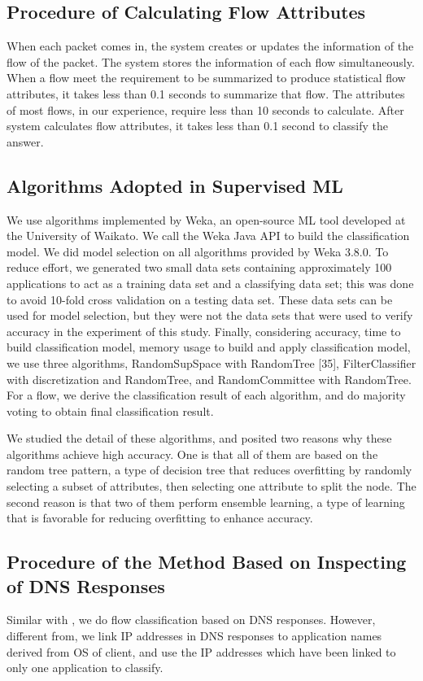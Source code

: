 \documentclass[journal]{IEEEtran}
\begin{document}
\subsection{Procedure of Calculating Flow Attributes}
When each packet comes in, the system creates or updates the information of the flow of the packet. The system stores the information of each flow simultaneously. When a flow meet the requirement to be summarized to produce statistical flow attributes, it takes less than 0.1 seconds to summarize that flow. The attributes of most flows, in our experience, require less than 10 seconds to calculate. After system calculates flow attributes, it takes less than 0.1 second to classify the answer.



\subsection{Algorithms Adopted in Supervised ML}
We use algorithms implemented by Weka, an open-source ML tool developed at the University of Waikato. We call the Weka Java API to build the classification model. We did model selection on all algorithms provided by Weka 3.8.0. To reduce effort, we generated two small data sets containing approximately 100 applications to act as a training data set and a classifying data set; this was done to avoid 10-fold cross validation on a testing data set. These data sets can be used for model selection, but they were not the data sets that were used to verify accuracy in the experiment of this study. Finally, considering accuracy, time to build classification model, memory usage to build and apply classification model, we use three algorithms, RandomSupSpace with RandomTree [35], FilterClassifier with discretization and RandomTree, and RandomCommittee with RandomTree. For a flow, we derive the classification result of each algorithm, and do majority voting to obtain final classification result.

We studied the detail of these algorithms, and posited two reasons why these algorithms achieve high accuracy. One is that all of them are based on the random tree pattern, a type of decision tree that reduces overfitting by randomly selecting a subset of attributes, then selecting one attribute to split the node. The second reason is that two of them perform ensemble learning, a type of learning that is favorable for reducing overfitting to enhance accuracy.



\subsection{Procedure of the Method Based on Inspecting of DNS Responses}
Similar with \cite{Plonka_flexibletraffic}, we do flow classification based on DNS responses. However, different from\cite{Plonka_flexibletraffic}, we link IP addresses in DNS responses to application names derived from OS of client, and use the IP addresses which have been linked to only one application to classify.
\end{document}
